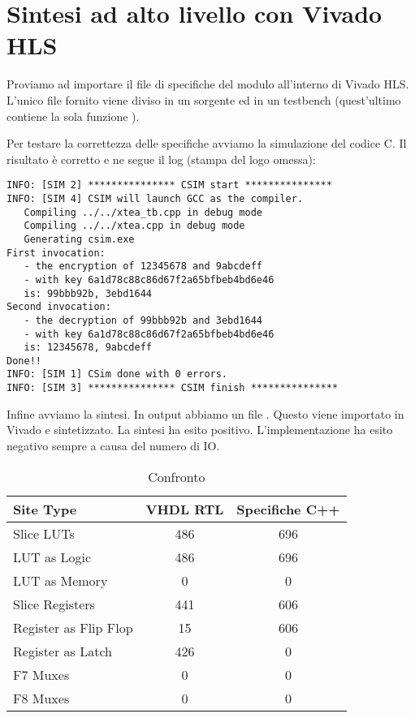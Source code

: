 \section{Sintesi ad alto livello con Vivado HLS}

Proviamo ad importare il file di specifiche del modulo all'interno di \textsf{Vivado HLS}. L'unico file fornito viene diviso in un sorgente ed in un testbench (quest'ultimo contiene la sola funzione ). 

Per testare la correttezza delle specifiche avviamo la simulazione del codice C. Il risultato è corretto e ne segue il log (stampa del logo omessa):
\begin{verbatim}
INFO: [SIM 2] *************** CSIM start ***************
INFO: [SIM 4] CSIM will launch GCC as the compiler.
   Compiling ../../xtea_tb.cpp in debug mode
   Compiling ../../xtea.cpp in debug mode
   Generating csim.exe
First invocation: 
   - the encryption of 12345678 and 9abcdeff 
   - with key 6a1d78c88c86d67f2a65bfbeb4bd6e46 
   is: 99bbb92b, 3ebd1644 
Second invocation: 
   - the decryption of 99bbb92b and 3ebd1644 
   - with key 6a1d78c88c86d67f2a65bfbeb4bd6e46 
   is: 12345678, 9abcdeff 
Done!!
INFO: [SIM 1] CSim done with 0 errors.
INFO: [SIM 3] *************** CSIM finish ***************
\end{verbatim}

Infine avviamo la sintesi. In output abbiamo un file . Questo viene importato in \textsf{Vivado} e sintetizzato. La sintesi ha esito positivo. L'implementazione ha esito negativo sempre a causa del numero di IO. 

\begin{table}[htbp]
    \centering
    \begin{tabular}{l S[table-format=3.0] S[table-format=3.0] }
        \toprule
        {Site Type}        	    & {VHDL RTL} & {Specifiche C++} \\ \midrule
 Slice LUTs              	    & 486	     &    696	 \\
 \quad LUT as Logic          	& 486	     &    696	 \\
 \quad LUT as Memory         	& 0	         &    0      \\
 Slice Registers         	    & 441	     &    606    \\
 \quad Register as Flip Flop 	& 15	     &    606    \\
 \quad Register as Latch     	& 426	     &    0      \\
 F7 Muxes                	    & 0	         &    0	     \\
 F8 Muxes                	    & 0	         &    0	     \\ \bottomrule
    \end{tabular}
    \caption{Confronto}
    \label{tab:confronto}
\end{table}

